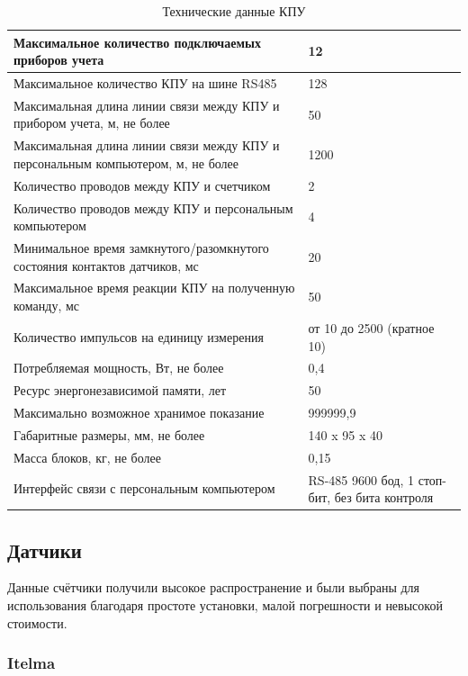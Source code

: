 \begin{table}[H]
	\caption{Технические данные КПУ} \label{tab:tab1}
	\centering
	\begin{tabular}{|p{10cm}|p{5cm}|}
		\hline 
		Максимальное количество подключаемых приборов учета & 12 \\ 
		\hline 
		Максимальное количество КПУ на шине RS485 & 128 \\ 
		\hline 
		Максимальная длина линии связи между КПУ и прибором учета, м, не более & 50 \\ 
		\hline 
		Максимальная длина линии связи между КПУ и персональным компьютером, м, не более & 1200 \\ 
		\hline
		Количество проводов между КПУ и счетчиком & 2 \\
		\hline
		Количество проводов между КПУ и персональным компьютером & 4 \\
		\hline
		Минимальное время замкнутого/разомкнутого состояния контактов датчиков, мс & 20 \\
		\hline
		Максимальное время реакции КПУ на полученную команду, мс & 50 \\
		\hline
		Количество импульсов на единицу измерения & от 10 до 2500 (кратное 10) \\
		\hline
		Потребляемая мощность, Вт, не более & 0,4 \\
		\hline
		Ресурс энергонезависимой памяти, лет & 50 \\
		\hline
		Максимально возможное хранимое показание & 999999,9 \\
		\hline
		Габаритные размеры, мм, не более & 140 x 95 x 40 \\
		\hline
		Масса блоков, кг, не более & 0,15 \\
		\hline
		Интерфейс связи с персональным компьютером & RS-485 9600 бод, 1 стоп-бит, без бита контроля \\
		\hline
	\end{tabular} 
	
\end{table}

\subsection{Датчики}

Данные счётчики получили высокое распространение и были выбраны для использования благодаря простоте установки, малой погрешности и невысокой стоимости. 

\subsubsection{Itelma}

